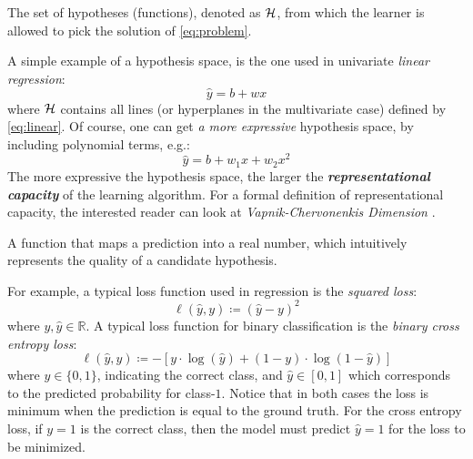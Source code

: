 \begin{definition}
	The set of hypotheses (functions), denoted as $\mathcal{H}$, from which the
	learner is allowed to pick the solution of \Equation{} \ref{eq:problem}.
\end{definition}

A simple example of a hypothesis space, is the one used in univariate
\emph{linear regression}:
\begin{equation}
	\label{eq:linear}
	\hat{y} = b + w x
\end{equation}
where $\mathcal{H}$ contains all lines (or hyperplanes in the multivariate case)
defined by \Equation{} \ref{eq:linear}. Of course, one can get \emph{a
more expressive} hypothesis space, by including polynomial terms, e.g.:
\begin{equation}
	\label{eq:polynomial}
	\hat{y} = b + w_1 x + w_2 x^2
\end{equation}
The more expressive the hypothesis space, the larger the
\emph{\textbf{representational capacity}} of
the learning algorithm. For a formal definition of representational capacity,
the interested reader can look at \emph{Vapnik-Chervonenkis
Dimension} \parencite{Hastie2009}.

\begin{definition}
	A function that maps a prediction into a real number, which intuitively
	represents the quality of a candidate hypothesis.
\end{definition}

For example, a typical loss function used in regression is the \emph{squared
loss}:
\begin{equation}
	\label{eq:squared_loss}
	\ell(\hat{y}, y) \coloneqq (\hat{y} - y)^2
\end{equation}
where $y, \hat{y} \in \mathbb{R}$. A typical loss function for binary
classification is the \emph{binary cross entropy
loss}:
\begin{equation}
	\label{eq:cross_entropy}
    \ell(\hat{y}, y) \coloneqq
    - \left[ y \cdot \log (\hat{y})
    + (1 - y) \cdot \log (1 - \hat{y}) \right]
\end{equation}
where $y \in \{0, 1\}$, indicating the correct class, and $\hat{y} \in [0, 1]$
which corresponds to the predicted probability for class-$1$. Notice that in
both cases the loss is minimum when the prediction is equal to the ground truth.
For the cross entropy loss, if $y=1$ is the correct class, then the model must
predict $\hat{y}=1$ for the loss to be minimized.

